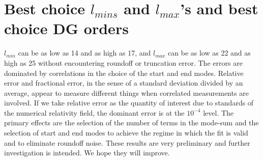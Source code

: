 \section{Best choice $l_{mins}$ and $l_{max}$'s and best choice DG orders}

$l_{min}$ can be as low as 14 and as high as 17, and $l_{max}$ can be as low as 22 and as high as 25 without encountering roundoff or truncation error. The errors are dominated by correlations in the choice of the start and end modes. Relative error and fractional error, in the sense of a standard deviation divided by an average, appear to measure different things when correlated measurements are involved. If we take relative error as the quantity of interest due to standards of the numerical relativity field, the dominant error is at the $10^{-4}$ level. The primary effects are the selection of the number of terms in the mode-sum and the selection of start and end modes to achieve the regime in which the fit is valid and to eliminate roundoff noise. These results are very preliminary and further investigation is intended. We hope they will improve.

